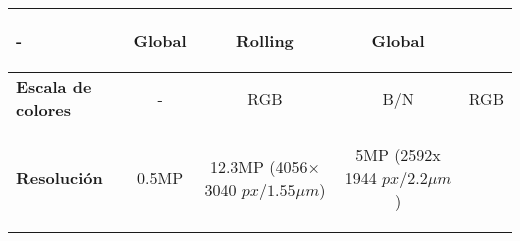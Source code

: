 \begin{itemize}
\begin{savenotes}
\begin{mytable}[H]
\begin{tabular}{l|c|c|c|c|}
\begin{minipage}{\mythirdmaxsizeofcontenttable}
\begin{myflushcenterinsidetable}
						- 
				\end{myflushcenterinsidetable}\end{minipage} & 
				\begin{minipage}{\mythirdmaxsizeofcontenttable}\begin{myflushcenterinsidetable}
						Global
				\end{myflushcenterinsidetable}\end{minipage} &
				\begin{minipage}{\mythirdmaxsizeofcontenttable}\begin{myflushcenterinsidetable}
						Rolling 
				\end{myflushcenterinsidetable}\end{minipage}&
				\begin{minipage}{\mythirdmaxsizeofcontenttable}\begin{myflushcenterinsidetable}
					Global 
				\end{myflushcenterinsidetable}\end{minipage} 			
				\\ \hline
				\multicolumn{1}{|l|}{
					\begin{minipage}{\myforthmaxsizeofcontenttable}	
						\textbf{Escala de colores}
					\end{minipage}
				} & - & RGB & B/N & RGB \\ \hline
				\multicolumn{1}{|l|}{
				\begin{minipage}{\myforthmaxsizeofcontenttable}	
					\textbf{Resolución}
				\end{minipage}
				} & 0.5MP & 
				\begin{minipage}{\mythirdmaxsizeofcontenttable}\begin{myflushcenterinsidetable}
					12.3MP (4056× 3040 $px/1.55{\mu}m$)
				\end{myflushcenterinsidetable}\end{minipage} & 
				\begin{minipage}{\mythirdmaxsizeofcontenttable}\begin{myflushcenterinsidetable}
					5MP (2592x 1944 $px/2.2{\mu}m$)
				\end{myflushcenterinsidetable}\end{minipage} & 

\end{tabular}
\end{mytable}
\end{savenotes}
\end{itemize}
